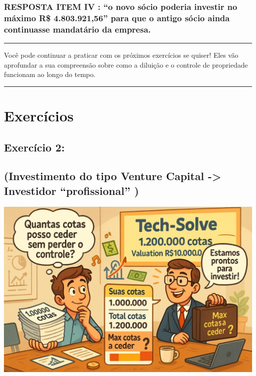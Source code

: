 \documentclass[
]{book}
\begin{document}
\subsubsection{RESPOSTA ITEM IV : ``o novo sócio poderia investir no máximo R\$ 4.803.921,56'' para que o antigo sócio ainda continuasse mandatário da empresa.}\label{resposta-item-iv-o-novo-suxf3cio-poderia-investir-no-muxe1ximo-r-4.803.92156-para-que-o-antigo-suxf3cio-ainda-continuasse-mandatuxe1rio-da-empresa.}

\begin{center}\rule{0.5\linewidth}{0.5pt}\end{center}

Você pode continuar a praticar com os próximos exercícios se quiser! Eles vão aprofundar a sua compreensão sobre como a diluição e o controle de propriedade funcionam ao longo do tempo.

\begin{center}\rule{0.5\linewidth}{0.5pt}\end{center}

\section{Exercícios}\label{exercuxedcios}

\subsection{\texorpdfstring{\textbf{Exercício 2:}}{Exercício 2:}}\label{exercuxedcio-2}

\subsection{(Investimento do tipo Venture Capital -\textgreater{} Investidor ``profissional'' )}\label{investimento-do-tipo-venture-capital---investidor-profissional}

\includegraphics[width=7.03125in,height=\textheight]{images/03-2025-08-19_20/exercicio-02.jpg}
\end{document}

